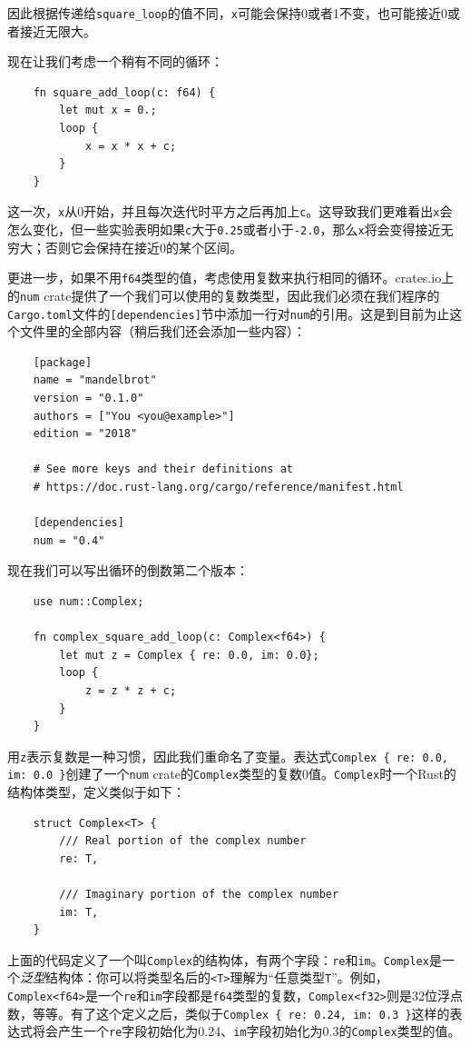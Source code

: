 因此根据传递给\texttt{square\_loop}的值不同，\texttt{x}可能会保持0或者1不变，也可能接近0或者接近无限大。

现在让我们考虑一个稍有不同的循环：
\begin{verbatim}
    fn square_add_loop(c: f64) {
        let mut x = 0.;
        loop {
            x = x * x + c;
        }
    }
\end{verbatim}

这一次，\texttt{x}从0开始，并且每次迭代时平方之后再加上\texttt{c}。这导致我们更难看出\texttt{x}会怎么变化，但一些实验表明如果\texttt{c}大于\texttt{0.25}或者小于\texttt{-2.0}，那么\texttt{x}将会变得接近无穷大；否则它会保持在接近0的某个区间。

更进一步，如果不用\texttt{f64}类型的值，考虑使用复数来执行相同的循环。crates.io上的\texttt{num} crate提供了一个我们可以使用的复数类型，因此我们必须在我们程序的\texttt{Cargo.toml}文件的\texttt{[dependencies]}节中添加一行对\texttt{num}的引用。这是到目前为止这个文件里的全部内容（稍后我们还会添加一些内容）：
\begin{verbatim}
    [package]
    name = "mandelbrot"
    version = "0.1.0"
    authors = ["You <you@example>"]
    edition = "2018"

    # See more keys and their definitions at
    # https://doc.rust-lang.org/cargo/reference/manifest.html

    [dependencies]
    num = "0.4"
\end{verbatim}

现在我们可以写出循环的倒数第二个版本：
\begin{verbatim}
    use num::Complex;

    fn complex_square_add_loop(c: Complex<f64>) {
        let mut z = Complex { re: 0.0, im: 0.0};
        loop {
            z = z * z + c;
        }
    }
\end{verbatim}

用\texttt{z}表示复数是一种习惯，因此我们重命名了变量。表达式\texttt{Complex \{ re: 0.0, im: 0.0 \}}创建了一个\texttt{num} crate的\texttt{Complex}类型的复数0值。\texttt{Complex}时一个Rust的结构体类型，定义类似于如下：
\begin{verbatim}
    struct Complex<T> {
        /// Real portion of the complex number
        re: T,

        /// Imaginary portion of the complex number
        im: T,
    }
\end{verbatim}

上面的代码定义了一个叫\texttt{Complex}的结构体，有两个字段：\texttt{re}和\texttt{im}。\texttt{Complex}是一个\emph{泛型}结构体：你可以将类型名后的\texttt{<T>}理解为“任意类型\texttt{T}”。例如，\texttt{Complex<f64>}是一个\texttt{re}和\texttt{im}字段都是\texttt{f64}类型的复数，\texttt{Complex<f32>}则是32位浮点数，等等。有了这个定义之后，类似于\texttt{Complex \{ re: 0.24, im: 0.3 \}}这样的表达式将会产生一个\texttt{re}字段初始化为0.24、\texttt{im}字段初始化为0.3的\texttt{Complex}类型的值。

